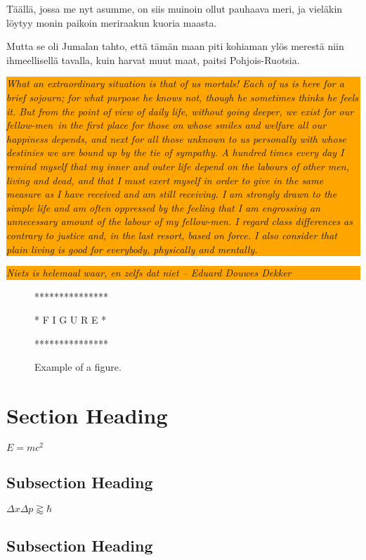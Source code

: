 \documentclass[dissertation,vertlayout,pdfa,colorlinks,nologo,table]{aaltoseries}
\newcommand*{\hilite}[1]{
 \setlength{\fboxsep}{3mm}%
 \begin{center}\colorbox{orange}{\parbox{0.9\columnwidth}{\textit{#1}}}\end{center}%
}
\begin{document}
\begin{quoting} 
Täällä, jossa me nyt asumme, on siis muinoin ollut pauhaava
meri, ja vieläkin löytyy monin paikoin meriraakun kuoria maasta. 

Mutta se oli Jumalan tahto, että tämän maan piti kohiaman ylös merestä niin
ihmeellisellä tavalla, kuin harvat muut maat, paitsi Pohjois-Ruotsia.
\end{quoting}

\hilite{
What an extraordinary situation is that of us mortals! Each of us is here for a
brief sojourn; for what purpose he knows not, though he sometimes thinks he
feels it. But from the point of view of daily life, without going deeper, we
exist for our fellow-men~in the first place for those on whose smiles and
welfare all our happiness depends, and next for all those unknown to us
personally with whose destinies we are bound up by the tie of sympathy. A
hundred times every day I remind myself that my inner and outer life depend on
the labours of other men, living and dead, and that I must exert myself in
order to give in the same measure as I have received and am still receiving. I
am strongly drawn to the simple life and am often oppressed by the feeling that
I am engrossing an unnecessary amount of the labour of my fellow-men. I regard
class differences as contrary to justice and, in the last resort, based on
force. I also consider that plain living is good for everybody, physically and
mentally.
}
\hilite{Niets is helemaal waar, en zelfs dat niet -- Eduard Douwes Dekker}


\begin{figure}

***************

* F I G U R E *

***************

\caption{Example of a figure.}
\end{figure}

\section{Section Heading}
$E=mc^2$
\lipsum[5-6]

\cite{WikiBooks2008:LaTeX}
\subsection{Subsection Heading}
$\Delta x\Delta p \gtrapprox \hbar$
\lipsum[7-8]
\subsection{Subsection Heading}
\lipsum[9-10]
\end{document}
